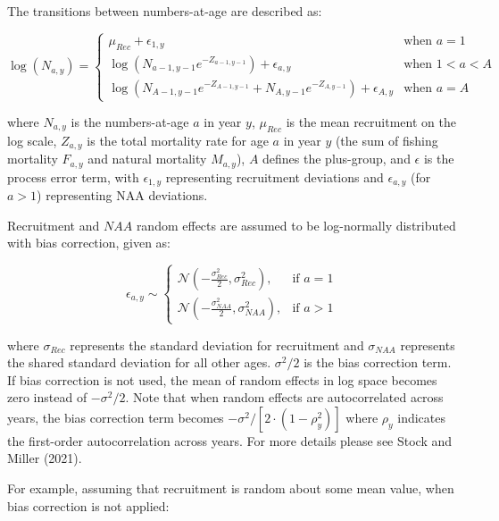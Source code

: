 \documentclass[
  12pt,
]{article}
\begin{document}
The transitions between numbers-at-age are described as:

\begin{equation}
\log(N_{a,y}) =
\begin{cases}
\mu_{Rec} + \epsilon_{1,y} & \text{when } a = 1 \\
\log(N_{a-1, y-1} e^{-Z_{a-1, y-1}}) + \epsilon_{a,y} & \text{when } 1 < a < A \\
\log(N_{A-1, y-1} e^{-Z_{A-1, y-1}} + N_{A, y-1} e^{-Z_{A, y-1}}) + \epsilon_{A,y} & \text{when } a = A
\end{cases}
\end{equation}

where \(N_{a,y}\) is the numbers-at-age \(a\) in year \(y\),
\(\mu_{Rec}\) is the mean recruitment on the log scale, \(Z_{a,y}\) is
the total mortality rate for age \(a\) in year \(y\) (the sum of fishing
mortality \(F_{a,y}\) and natural mortality \(M_{a,y}\)), \(A\) defines
the plus-group, and \(\epsilon\) is the process error term, with
\(\epsilon_{1,y}\) representing recruitment deviations and
\(\epsilon_{a,y}\) (for \(a>1\)) representing NAA deviations.

Recruitment and \(NAA\) random effects are assumed to be log-normally
distributed with bias correction, given as:

\begin{equation}
\epsilon_{a,y} \sim 
\begin{cases} 
\mathcal{N}\left(-\frac{\sigma_{Rec}^2}{2}, \sigma_{Rec}^2\right), & \text{if } a = 1 \\
\mathcal{N}\left(-\frac{\sigma_{NAA}^2}{2}, \sigma_{NAA}^2\right), & \text{if } a > 1
\end{cases}
\end{equation}

where \(\sigma_{Rec}\) represents the standard deviation for recruitment
and \(\sigma_{NAA}\) represents the shared standard deviation for all
other ages. \(\sigma^2/2\) is the bias correction term. If bias
correction is not used, the mean of random effects in log space becomes
zero instead of \(-\sigma^2/2\). Note that when random effects are
autocorrelated across years, the bias correction term becomes
\(-\sigma^2 / [2 \cdot (1 - \rho_y^2)]\) where \(\rho_{y}\) indicates
the first-order autocorrelation across years. For more details please
see Stock and Miller (2021).

For example, assuming that recruitment is random about some mean value,
when bias correction is not applied:
\end{document}
